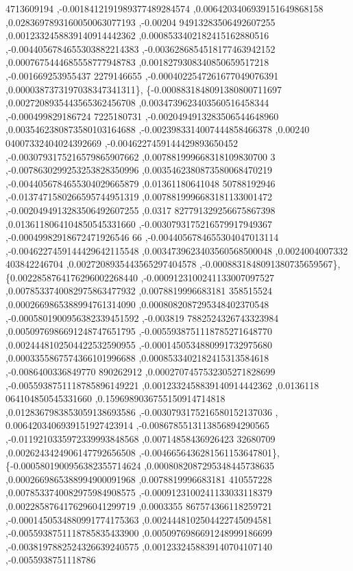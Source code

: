 \begin{DoxyCode}
      4713609194 ,-0.0018412191989377489284574 ,0.0064203406939151649868158 ,0.0283697893160050063077193 ,-0.00204
      94913283506492607255 ,0.0012332458839140914442362 ,0.0008533402182415162880516 ,-0.0044056784655303882214383
       ,-0.0036286854518177463942152 ,0.0007675444685558777948783 ,0.0018279308340850659517218 ,-0.001669253955437
      2279146655 ,-0.0004022547261677049076391 ,0.0000387373197038347341311\},
\{-0.0008831848091380800711697 ,0.0027208935443565362456708 ,0.0034739623403560516458344 ,-0.000499829186724
      7225180731 ,-0.0020494913283506544648960 ,0.0035462380873580103164688 ,-0.0023983314007444858466378 ,0.00240
      04007332404024392669 ,-0.0046227459144429893650452 ,-0.0030793175216579865907662 ,0.007881999668318109830700
      3 ,-0.0078630299253253828350996 ,0.0035462380873580068470219 ,-0.0044056784655304029665879 ,0.01361180641048
      50788192946 ,-0.0137471580266595744951319 ,0.0078819996683181133001472 ,-0.0020494913283506492607255 ,0.0317
      827791329256675867398 ,0.0136118064104850545331660 ,-0.0030793175216579917949367 ,-0.00049982918672471926546
      66 ,-0.0044056784655304047013114 ,-0.0046227459144429642115548 ,0.0034739623403560568500048 ,0.0024004007332
      403842246704 ,0.0027208935443565297404578 ,-0.0008831848091380735659567\},
\{0.0022858764176296002268440 ,-0.0009123100241133007097527 ,0.0078533740082975863477932 ,0.0078819996683181
      358515524 ,0.0002669865388994761314090 ,0.0008082087295348402370548 ,-0.0005801900956382339451592 ,-0.003819
      7882524326743323984 ,0.0050976986691248747651795 ,-0.0055938751118785271648770 ,0.0024448102504422532590955 
      ,-0.0001450534880991732975680 ,0.0003355867574366101996688 ,0.0008533402182415313584618 ,-0.0086400336849770
      890262912 ,0.0002707457532305271828699 ,-0.0055938751118785896149221 ,0.0012332458839140914442362 ,0.0136118
      064104850545331660 ,0.1596989036755150914714818 ,0.0128367983853059138693586 ,-0.0030793175216580152137036 ,
      0.0064203406939151927423914 ,-0.0086785513113856894290565 ,-0.0119210335972339993848568 ,0.00714858436926423
      32680709 ,0.0026243424906147792656508 ,-0.0046656436281561153647801\},
\{-0.0005801900956382355714624 ,0.0008082087295348445738635 ,0.0002669865388994900091968 ,0.0078819996683181
      410557228 ,0.0078533740082975984908575 ,-0.0009123100241133033118379 ,0.0022858764176296041299719 ,0.0003355
      867574366118259721 ,-0.0001450534880991774175363 ,0.0024448102504422745094581 ,-0.0055938751118785835433900 
      ,0.0050976986691248999186699 ,-0.0038197882524326639240575 ,0.0012332458839140704107140 ,-0.0055938751118786

\end{DoxyCode}
